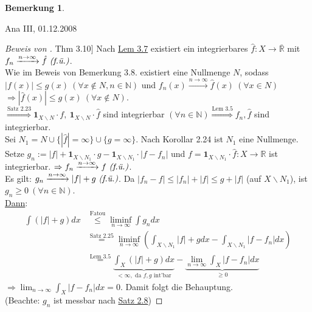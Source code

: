 \documentclass[a4paper]{report}
\newcommand{\doubleOne}{\textbf{1}}
\newcommand{\R}{\mathbb{R}}
\newcommand{\Rq}{\overline{\R}}
\newcommand{\N}{\mathbb{N}}
\newcommand{\toInf}{\rightarrow \infty}
\newcommand{\limToInf}[1]{\lim_{#1 \toInf}}
\newcommand{\jlabel}[1]{\label{j_#1}}
\newcommand{\jshortlink}[1]{\jhyperref{#1}{\text{#1}}}
\newcommand{\jhyperref}[2]{\hyperref[j_#1]{#2}}
\newcommand{\jlink}[1]{\jhyperref{#1}{#1}}
\newcommand{\fu}{\text{\textit{(f.ü.)}}}
\newcommand{\jabb}[3]{ #1: #2 \rightarrow #3 }
\newcommand{\jspacesmall}{\vspace{4pt}}
\newcommand{\jdate}[1]{\jspacesmall\begin{center}\jlabel{#1}\tiny{Ana III, #1}\end{center}}
\theoremstyle{plain}
\theoremstyle{definition}
\newtheorem{bem}[thm]{Bemerkung}
\begin{document}
{{{{\begin{bem}
\end{bem}


\jdate{01.12.2008}


\begin{proof}[Beweis von \jlink{Thm 3.10}]
    Nach \jlink{Lem 3.7} existiert ein integrierbares $\jabb{\hat{f}}{X}{\Rq}$ mit $f_n \xrightarrow{n\rightarrow \infty} \hat{f} \ \fu$.\\
    Wie im Beweis von Bemerkung 3.8. existiert eine Nullmenge $N$, sodass\\
    $|f(x)| \le g(x) \ (\forall x\notin N, n \in\N)$ und $f_n(x) \xrightarrow{n \rightarrow \infty} \hat{f}(x) \ (\forall x\in N)$\\
    $\Rightarrow |\hat{f}(x)| \le g(x) \ (\forall x\notin N)$.\\
    $\overset{\jshortlink{Satz 2.23}}{\Rightarrow} \doubleOne_{X\backslash N}\cdot f, \ \doubleOne_{X\backslash N}\cdot \hat{f}$ sind integrierbar $(\forall n\in\N) \overset{\jshortlink{Lem 3.5}}{\Rightarrow} f_n, \hat{f}$ sind integrierbar.\\
    Sei $N_1 = N \cup \{|\hat{f}| = \infty\} \cup \{g=\infty\}$. Nach Korollar 2.24 ist $N_1$ eine Nullmenge.\\
    Setze $g_n := |f| + \doubleOne_{X\backslash N_1} \cdot g - \doubleOne_{X\backslash N_1}\cdot |f-f_n|$ und $f=\jabb{\doubleOne_{X\backslash N_1}\cdot \hat{f}}{X}{\R}$ ist integrierbar. $\Rightarrow f_n \xrightarrow{n\rightarrow \infty} f \ \fu$.\\
    Es gilt: $g_n \xrightarrow{n\rightarrow \infty}|f|+g \ \fu$. Da $|f_n-f| \le |f_n| + |f| \le g + |f|$ (auf $X\backslash N_1$), ist $g_n \ge 0 \ (\forall n\in\N)$.\\
    \uline{Dann}:
    \begin{displaymath}
        \begin{split}
            \int (|f|+g) dx &\overset{\text{Fatou}}{\le} \liminf_{n\rightarrow \infty} \int g_n dx \\
            &\overset{\jshortlink{Satz 2.25}}{=} \liminf_{n\rightarrow \infty}(\int_{X\backslash N_1} |f| + g dx - \int_{X\backslash N_1} |f-f_n| dx) \\
            &\overset{\jshortlink{Lem 3.5}}{=} \underbrace{\int_X(|f| + g)dx}_{< \infty,\text{ da $f,g$ int'bar}} - \underbrace{\lim_{n\rightarrow\infty} \int_X|f-f_n|dx}_{\ge 0}
        \end{split}
    \end{displaymath}
    $\Rightarrow \limToInf{n} \int_X |f-f_n| dx = 0$. Damit folgt die Behauptung.\\
    (Beachte: $g_n$ ist messbar nach \jlink{Satz 2.8})
\end{proof}


}}}}
\end{document}
